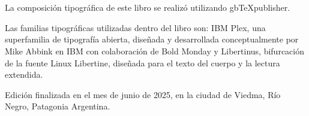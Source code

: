 \chapter*{}
\justifying

{\small La composición tipográfica de este libro se realizó utilizando gbTeXpublisher.

Las familias tipográficas utilizadas dentro del libro son: IBM Plex, una superfamilia de tipografía abierta, diseñada y desarrollada conceptualmente por Mike Abbink en IBM con colaboración de Bold Monday y Libertinus, bifurcación de la fuente Linux Libertine, diseñada para el texto del cuerpo y la lectura extendida.

Edición finalizada en el mes de junio de 2025, en la ciudad de Viedma, Río Negro, Patagonia Argentina.}
